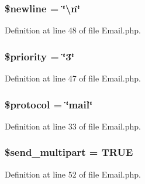 \hypertarget{class_c_i___email_a8735d5c31c4af1004825e6a28f236aeb}{
\subsubsection[{\$newline}]{\setlength{\rightskip}{0pt plus 5cm}\$newline = \char`\"{}\textbackslash{}n\char`\"{}}}\label{class_c_i___email_a8735d5c31c4af1004825e6a28f236aeb}


Definition at line 48 of file Email.\-php.

\hypertarget{class_c_i___email_a2677e505e860db863720ac4e216fd3f2}{
\subsubsection[{\$priority}]{\setlength{\rightskip}{0pt plus 5cm}\$priority = \char`\"{}3\char`\"{}}}\label{class_c_i___email_a2677e505e860db863720ac4e216fd3f2}


Definition at line 47 of file Email.\-php.

\hypertarget{class_c_i___email_ac01bf1cf041487498864d054b991f570}{
\subsubsection[{\$protocol}]{\setlength{\rightskip}{0pt plus 5cm}\$protocol = \char`\"{}mail\char`\"{}}}\label{class_c_i___email_ac01bf1cf041487498864d054b991f570}


Definition at line 33 of file Email.\-php.

\hypertarget{class_c_i___email_ad646213e73754a396d49eacaa7fc8218}{
\subsubsection[{\$send\-\_\-multipart}]{\setlength{\rightskip}{0pt plus 5cm}\$send\-\_\-multipart = T\-R\-U\-E}}\label{class_c_i___email_ad646213e73754a396d49eacaa7fc8218}


Definition at line 52 of file Email.\-php.

